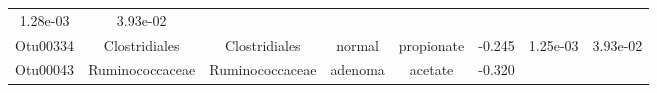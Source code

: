 \documentclass[11pt,]{article}
\begin{document}
\begin{longtable}[]{@{}cccccccc@{}}
\begin{minipage}[t]{0.08\columnwidth}
1.28e-03\strut
\end{minipage} & \begin{minipage}[t]{0.08\columnwidth}\centering\strut
3.93e-02\strut
\end{minipage}\tabularnewline
\begin{minipage}[t]{0.08\columnwidth}\centering\strut
Otu00334\strut
\end{minipage} & \begin{minipage}[t]{0.15\columnwidth}\centering\strut
Clostridiales\strut
\end{minipage} & \begin{minipage}[t]{0.15\columnwidth}\centering\strut
Clostridiales\strut
\end{minipage} & \begin{minipage}[t]{0.08\columnwidth}\centering\strut
normal\strut
\end{minipage} & \begin{minipage}[t]{0.09\columnwidth}\centering\strut
propionate\strut
\end{minipage} & \begin{minipage}[t]{0.07\columnwidth}\centering\strut
-0.245\strut
\end{minipage} & \begin{minipage}[t]{0.08\columnwidth}\centering\strut
1.25e-03\strut
\end{minipage} & \begin{minipage}[t]{0.08\columnwidth}\centering\strut
3.93e-02\strut
\end{minipage}\tabularnewline
\begin{minipage}[t]{0.08\columnwidth}\centering\strut
Otu00043\strut
\end{minipage} & \begin{minipage}[t]{0.15\columnwidth}\centering\strut
Ruminococcaceae\strut
\end{minipage} & \begin{minipage}[t]{0.15\columnwidth}\centering\strut
Ruminococcaceae\strut
\end{minipage} & \begin{minipage}[t]{0.08\columnwidth}\centering\strut
adenoma\strut
\end{minipage} & \begin{minipage}[t]{0.09\columnwidth}\centering\strut
acetate\strut
\end{minipage} & \begin{minipage}[t]{0.07\columnwidth}\centering\strut
-0.320\strut
\end{minipage} & \begin{minipage}[t]{0.08\columnwidth}\centering\strut

\end{minipage}
\end{longtable}
\end{document}
